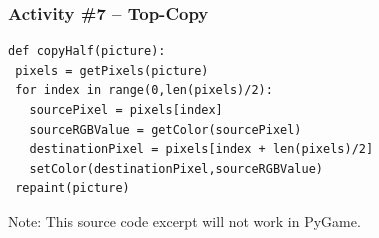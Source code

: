 \begin{frame}[fragile]
	\frametitle{Activity \#7 -- Top-Copy}

\begin{lstlisting}
def copyHalf(picture):
 pixels = getPixels(picture)
 for index in range(0,len(pixels)/2):
   sourcePixel = pixels[index]
   sourceRGBValue = getColor(sourcePixel)
   destinationPixel = pixels[index + len(pixels)/2]
   setColor(destinationPixel,sourceRGBValue)
 repaint(picture)
\end{lstlisting}

Note: This source code excerpt will not work in PyGame.

\end{frame}


